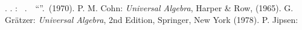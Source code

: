 \documentclass[12pt]{article}
\theoremstyle{definition}
\begin{document}



\begin{thebibliography}{7}
 \CYRA. \CYRI. \CYRM\cyra\cyrl\cyrsftsn\cyrc\cyre\cyrv: 
{\em \CYRA\cyrl\cyrg\cyre\cyrb\cyrr\cyra\cyri\cyrch\cyre\cyrs\cyrk\cyri\cyre \,
\cyrs\cyri\cyrs\cyrt\cyre\cyrm\cyrery}. \,\CYRI\cyrz\cyrd\cyra\cyrt\cyre\cyrl\cyrsftsn\cyrs\cyrt\cyrv\cyro \,
``\CYRN\cyra\cyru\cyrk\cyra''. \CYRM\cyro\cyrs\cyrk\cyrv\cyra \,(1970).
 P. M. Cohn: {\em Universal Algebra}, Harper \& Row, (1965).
 G. Gr\"{a}tzer: {\em Universal Algebra}, 2nd Edition, Springer, New York (1978).
 P. Jipsen: {\em {}}
\end{thebibliography}
\end{document}
